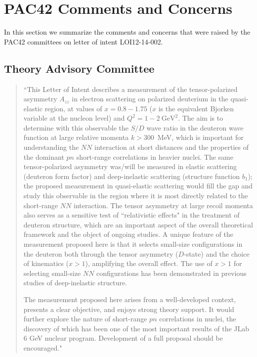 \section{PAC42 Comments and Concerns}

In this section we summarize the comments and concerns that were raised by the PAC42 committees on letter of intent LOI12-14-002.

\subsection{Theory Advisory Committee}

\begin{quote}
``This Letter of Intent describes a measurement of the tensor-polarized asymmetry $A_{zz}$ in electron scattering on polarized deuterium in the quasi-elastic region, at values of $x = 0.8 - 1.75$ ($x$ is the equivalent Bjorken variable at the nucleon level) and $Q^2 = 1 − 2 \mathrm{~GeV} ^2$. The aim is to determine with this observable the $S/D$ wave ratio in the deuteron wave function at large relative momenta $k > 300$~MeV, which is important for understanding the $NN$ interaction at short distances and the properties of the dominant $pn$ short-range correlations in heavier nuclei. The same tensor-polarized asymmetry was/will be measured in elastic scattering (deuteron form factor) and deep-inelastic scattering (structure function $b_1$); the proposed measurement in quasi-elastic scattering would fill the gap and study this observable in the region where it is most directly related to the short-range $NN$ interaction. The tensor asymmetry at large recoil momenta also serves as a sensitive test of ``relativistic effects" in the treatment of deuteron structure, which are an important aspect of the overall theoretical framework and the object of ongoing studies. A unique feature of the measurement proposed here is that it selects small-size configurations in the deuteron both through the tensor asymmetry ($D$-state) and the choice of kinematics ($x > 1$), amplifying the overall effect. The use of $x > 1$ for selecting small-size $NN$ configurations has been demonstrated in previous studies of deep-inelastic structure. 

The measurement proposed here arises from a well-developed context, presents a clear objective, and enjoys strong theory support. It would further explore the nature of short-range $pn$ correlations in nuclei, the discovery of which has been one of the most important results of the JLab 6 GeV nuclear program. Development of a full proposal should be encouraged."
\end{quote}

